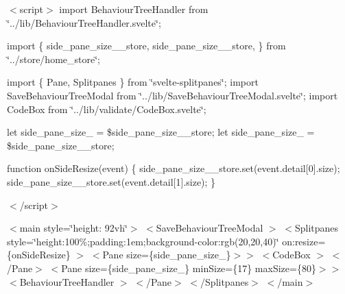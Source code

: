 $<$script$>$ import Behaviour\+Tree\+Handler from \char`\"{}../lib/\+Behaviour\+Tree\+Handler.\+svelte\char`\"{};

import \{ side\+\_\+pane\+\_\+size\+\_\+\_\+store, side\+\_\+pane\+\_\+size\+\_\+\_\+store, \} from \char`\"{}../store/home\+\_\+store\char`\"{};

import \{ Pane, Splitpanes \} from \char`\"{}svelte-\/splitpanes\char`\"{}; import Save\+Behaviour\+Tree\+Modal from \char`\"{}../lib/\+Save\+Behaviour\+Tree\+Modal.\+svelte\char`\"{}; import Code\+Box from \char`\"{}../lib/validate/\+Code\+Box.\+svelte\char`\"{};

let side\+\_\+pane\+\_\+size\+\_ = \$side\+\_\+pane\+\_\+size\+\_\+\_\+store; let side\+\_\+pane\+\_\+size\+\_ = \$side\+\_\+pane\+\_\+size\+\_\+\_\+store;

function on\+Side\+Resize(event) \{ side\+\_\+pane\+\_\+size\+\_\+\_\+store.\+set(event.\+detail\mbox{[}0\mbox{]}.size); side\+\_\+pane\+\_\+size\+\_\+\_\+store.\+set(event.\+detail\mbox{[}1\mbox{]}.size); \}

$<$/script$>$

$<$main style=\char`\"{}height\+: 92vh\char`\"{}$>$ $<$\+Save\+Behaviour\+Tree\+Modal $>$ $<$\+Splitpanes         style=\char`\"{}height\+:100\%;padding\+:1em;background-\/color\+:rgb(20,20,40)\char`\"{}         on\+:resize=\{on\+Side\+Resize\}     $>$ $<$\+Pane size=\{side\+\_\+pane\+\_\+size\+\_\}$>$$>$ $<$\+Code\+Box $>$ $<$/\+Pane$>$ $<$\+Pane size=\{side\+\_\+pane\+\_\+size\+\_\} min\+Size=\{17\} max\+Size=\{80\}$>$$>$ $<$\+Behaviour\+Tree\+Handler $>$ $<$/\+Pane$>$ $<$/\+Splitpanes$>$ $<$/main$>$ 